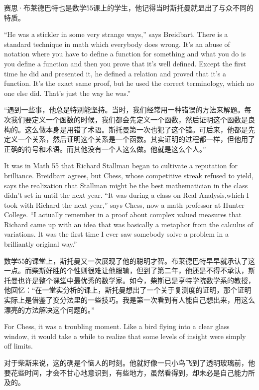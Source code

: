 \ifdefined\chs
赛思·布莱德巴特也是数学55课上的学生，他记得当时斯托曼就显出了与众不同的特质。
\fi

\ifdefined\eng
``He was a stickler in some very strange ways,'' says Breidbart. There is a standard technique in math which everybody does wrong. It's an abuse of notation where you have to define a function for something and what you do is you define a function and then you prove that it's well defined. Except the first time he did and presented it, he defined a relation and proved that it's a function. It's the exact same proof, but he used the correct terminology, which no one else did. That's just the way he was.''
\fi

\ifdefined\chs
``遇到一些事，他总是特别能坚持。当时，我们经常用一种错误的方法来解题。每次我们要定义一个函数的时候，我们都会先定义一个函数，然后证明这个函数是良构的。这么做本身是用错了术语。斯托曼第一次也犯了这个错。可后来，他都是先定义一个关系，然后证明这个关系是一个函数。其实证明的过程都一样，但他用了正确的符号和术语。而其他没有一个人这么做。他就是这么个人。''
\fi

\ifdefined\eng
It was in Math 55 that Richard Stallman began to cultivate a reputation for brilliance. Breidbart agrees, but Chess, whose competitive streak refused to yield, says the realization that Stallman might be the best mathematician in the class didn't set in until the next year. ``It was during a class on Real Analysis,\ifdefined\vone which I took with Richard the next year,\fi '' says Chess, now a math professor at Hunter College. ``I actually remember in a proof about complex valued measures that Richard came up with an idea that was basically a metaphor from the calculus of variations. It was the first time I ever saw somebody solve a problem in a brilliantly original way.''
\fi

\ifdefined\chs
数学55的课堂上，斯托曼又一次展现了他的聪明才智。布莱德巴特早早就承认了这一点。而柴斯好胜的个性则很难让他服输，但到了第二年，他还是不得不承认，斯托曼也许是整个课堂中最优秀的数学家。如今，柴斯已是亨特学院数学系的教授，他回忆：``在一堂实分析的课上，斯托曼想出了一个关于复测度的证明，那个证明实际上是借鉴了变分法里的一些技巧。我是第一次看到有人能自己想出来，用这么漂亮的方法解决这个问题的。''
\fi

\ifdefined\vtwo
\ifdefined\eng
For Chess, it was a troubling moment. Like a bird flying into a clear glass window, it would take a while to realize that some levels of insight were simply off limits.
\fi

\ifdefined\chs
对于柴斯来说，这的确是个恼人的时刻。他就好像一只小鸟飞到了透明玻璃前，他要花些时间，才会不甘心地意识到，有些地方，虽然看得到，却未必是自己能力所及的。
\fi
\fi

